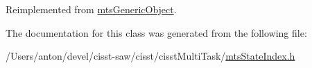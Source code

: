 Reimplemented from \hyperlink{classmts_generic_object_a4916a6c62ee5b167d7c93c88ab72523a}{mts\+Generic\+Object}.



The documentation for this class was generated from the following file\+:\begin{DoxyCompactItemize}
\item 
/\+Users/anton/devel/cisst-\/saw/cisst/cisst\+Multi\+Task/\hyperlink{mts_state_index_8h}{mts\+State\+Index.\+h}\end{DoxyCompactItemize}
